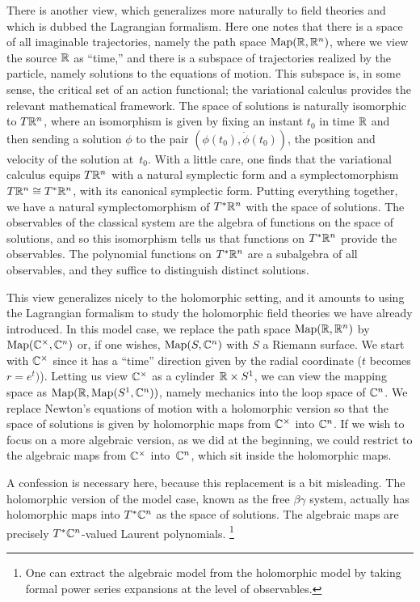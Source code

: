 \documentclass[11pt]{amsart}
\begin{document}
There is another view, which generalizes more naturally to field theories and which is dubbed the Lagrangian formalism.
Here one notes that there is a space of all imaginable trajectories, namely the path space ${\rm Map}(\mathbb R, \mathbb R^n)$, where we view the source $\mathbb R$ as ``time,''
and there is a subspace of trajectories realized by the particle, namely solutions to the equations of motion.
This subspace is, in some sense, the critical set of an action functional; 
the variational calculus provides the relevant mathematical framework.
The space of solutions is naturally isomorphic to $T \mathbb R^n$,
where an isomorphism is given by fixing an instant $t_0$ in time $\mathbb R$ and then sending a solution $\phi$ to the pair $(\phi(t_0), \dot{\phi}(t_0))$, the position and velocity of the solution at~$t_0$.
With a little care, one finds that the variational calculus equips $T \mathbb R^n$ with a natural symplectic form and a symplectomorphism $T\mathbb R^n \cong T^* \mathbb R^n$, with its canonical symplectic form. 
Putting everything together, we have a natural symplectomorphism of $T^* \mathbb R^n$ with the space of solutions.
The observables of the classical system are the algebra of functions on the space of solutions,
and so this isomorphism tells us that functions on $T^* \mathbb R^n$ provide the observables.
The polynomial functions on $T^* \mathbb R^n$ are a subalgebra of all observables, 
and they suffice to distinguish distinct solutions.

This view generalizes nicely to the holomorphic setting,
and it amounts to using the Lagrangian formalism to study the holomorphic field theories we have already introduced.
In this model case, we replace the path space ${\rm Map}(\mathbb R, \mathbb R^n)$ by ${\rm Map}(\mathbb C^\times, \mathbb C^n)$ or, if one wishes, ${\rm Map}(S, \mathbb C^n)$ with $S$ a Riemann surface.
We start with $\mathbb C^\times$ since it has a ``time'' direction given by the radial coordinate ($t$ becomes $r = e^t)$).
Letting us view $\mathbb C^\times$ as a cylinder $\mathbb R \times S^1$, we can view the mapping space as  ${\rm Map}(\mathbb R, {\rm Map}(S^1,\mathbb C^n))$, namely mechanics into the loop space of $\mathbb C^n$.
We replace Newton's equations of motion with a holomorphic version
so that the space of solutions is given by holomorphic maps from $\mathbb C^\times$ into $\mathbb C^n$.
If we wish to focus on a more algebraic version, as we did at the beginning,
we could restrict to the algebraic maps from $\mathbb C^\times$ into~$\mathbb C^n$,
which sit inside the holomorphic maps.

A confession is necessary here, because this replacement is a bit misleading.
The holomorphic version of the model case, known as the free $\beta\gamma$ system,
actually has holomorphic maps into $T^* \mathbb C^n$ as the space of solutions.
The algebraic maps are precisely $T^* \mathbb C^n$-valued Laurent polynomials.
\footnote{One can extract the algebraic model from the holomorphic model by taking formal power series expansions at the level of observables.}
\end{document}
